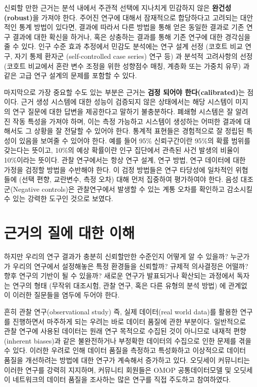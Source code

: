 \documentclass[11pt]{book}
\theoremstyle{definition}
\theoremstyle{definition}
\theoremstyle{definition}
\theoremstyle{remark}
\begin{document}
신뢰할 만한 근거는 분석 내에서 주관적 선택에 지나치게 민감하지 않은
\textbf{완건성(robust)}을 가져야 한다. 주어진 연구에 대해서 잠재적으로
합당하다고 고려되는 대안적인 통계 방법이 있다면, 결과에 따라서 다른
방법을 통해 얻은 동일한 결과로 기존 연구 결과에 대한 확신을 하거나, 혹은
상충하는 결과를 통해 기존 연구에 대한 경각심을 줄 수 있다.
\citep{madigan2013design} 인구 수준 효과 추정에서 민감도 분석에는 연구
설계 선정 (코호트 비교 연구, 자기 통제 환자군 (self-controlled case
series) 연구 등) 과 분석적 고려사항의 선정 (코호트 비교에서 혼란 변수
조정을 위한 성향점수 매칭, 계층화 또는 가중치 유무) 과 같은 고급 연구
설계의 문제를 포함할 수 있다.

마지막으로 가장 중요할 수도 있는 부분은 근거는 \textbf{검정 되어야
한다(calibrated)}는 점이다. 근거 생성 시스템에 대한 성능이 검증되지 않은
상태에서는 해당 시스템이 미지의 연구 질문에 대한 답변을 제공한다고
말하기 불충분하다. 폐쇄형 시스템은 잘 알려진 작동 특성을 가져야 하며,
이는 측정 가능하고 시스템이 생성하는 어떠한 결과에 대해서도 그 상황을 잘
전달할 수 있어야 한다. 통계적 표현들은 경험적으로 잘 정립된 특성이
있음을 보여줄 수 있어야 한다. 예를 들어 95\% 신뢰구간이란 95\%의 확률
범위를 갖는다는 뜻이고, 10\%의 예상 확률이란 인구 집단에서 관측된 사건
발생의 비율이 10\%이라는 뜻이다. 관찰 연구에서는 항상 연구 설계, 연구
방법, 연구 데이터에 대한 가정을 검정할 방법을 수반해야 한다. 이 검정
방법들은 연구 타당성에 일차적인 위협들에 (선택 편향, 교란변수, 측정
오차) 대해 먼저 집중하여 평가하여야 한다. 음성 대조군(Negative
controls)은 관찰연구에서 발생할 수 있는 계통 오차를 확인하고 감소시킬 수
있는 강력한 도구인 것으로 보였다.
\citep{schuemie_2016, schuemie_2018, schuemie_2018b}

\section{근거의 질에 대한 이해}\label{---}

하지만 우리의 연구 결과가 충분히 신뢰할만한 수준인지 어떻게 알 수
있을까? 누군가가 우리의 연구에서 설정해놓은 특정 환경들을 신뢰할까?
규제적 의사결정은 어떨까? 향후 연구의 기반이 될 수 있을까? 새로운 연구가
발표되거나 확산되는 과정에서 독자는 연구의 형태 (무작위 대조시험, 관찰
연구, 혹은 다른 유형의 분석 방법) 에 관계없이 이러한 질문들을 염두에
두어야 한다.  

흔히 관찰 연구(observational study) 즉, 실제 데이터(real world data)를
활용한 연구를 진행하면서 마주하게 되는 우려는 바로 데이터 품질에 관한
부분이다. \citep{botsis2010secondary, hersh2013caveats, sherman2016real}
일반적으로 관찰 연구에 사용된 데이터는 원래 연구 목적으로 수집된 것이
아니므로 내재적 편향(inherent biases)과 같은 불완전하거나 부정확한
데이터의 수집으로 인한 문제를 겪을 수 있다. 이러한 우려로 인해 데이터
품질을 측정하고 특성화하고 이상적으로 데이터 품질을 개선하려는 방법에
대한 연구가 계속해서 증가하고 있다.
\citep{kahn2012pragmatic, liaw2013towards, weiskopf_2013} 오딧세이
커뮤니티는 이러한 연구를 강력히 지지하며, 커뮤니티 회원들은 OMOP
공통데이터모델 및 오딧세이 네트워크의 데이터 품질을 조사하는 많은 연구를
직접 주도하고 참여하였다.
\citep{huser_multisite_2016, kahn_transparent_2015, callahan2017comparison, yoon_2016}
 
\end{document}
